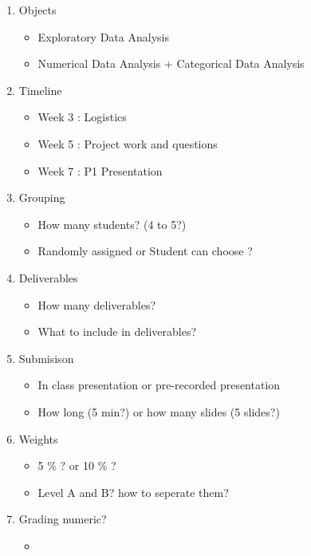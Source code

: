 \documentclass[12pt]{article}
\begin{document}
\begin{enumerate}
    \item Objects
    \begin{itemize}
        \item Exploratory Data Analysis 
        \item Numerical Data Analysis + Categorical Data Analysis
    \end{itemize}
    \item Timeline
    \begin{itemize}
        \item Week 3 : Logistics 
        \item Week 5 : Project work and questions
        \item Week 7 : P1 Presentation 
    \end{itemize}

    \item  Grouping 
    \begin{itemize}
        \item How many students? (4 to 5?)
        \item Randomly assigned or Student can choose ? 
    \end{itemize}
    \item Deliverables
    \begin{itemize}
        \item How many deliverables? 
        \item What to include in deliverables? 
    \end{itemize} 
    \item Submisison
    \begin{itemize}
        \item In class presentation or pre-recorded presentation
        \item How long (5 min?) or how many slides (5 slides?)
    \end{itemize}
    \item Weights
    \begin{itemize}
        \item 5 \% ? or 10 \% ?
        \item Level A and B? how to seperate them? 
    \end{itemize}
    \item Grading numeric?
    \begin{itemize}
        \item 
    \end{itemize}


\end{enumerate}
    
\end{document}
